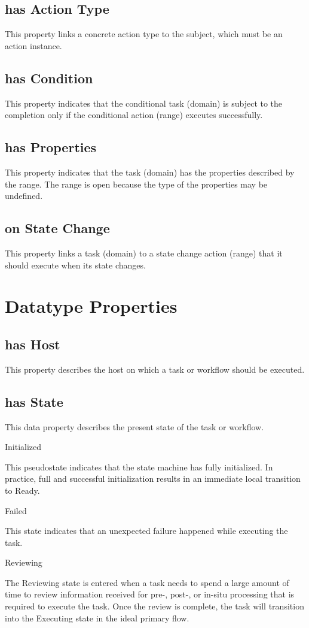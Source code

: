 			\subsection{
			has Action Type
			}
			This property links a concrete action type to the subject, which must be an action instance.
			\subsection{
			has Condition
			}
			This property indicates that the conditional task (domain) is subject to the completion only if the conditional action (range) executes successfully.
			\subsection{
			has Properties
			}
			This property indicates that the task (domain) has the properties described by the range. The range is open because the type of the properties may be undefined.
			\subsection{
			on State Change
			}
			This property links a task (domain) to a state change action (range) that it should execute when its state changes.
\section{Datatype Properties}
			\subsection{
			has Host
			}
			This property describes the host on which a task or workflow should be executed.
			\subsection{
			has State
			}
			This data property describes the present state of the task or workflow.

Initialized

This pseudostate indicates that the state machine has fully initialized. In practice, full and successful initialization results in an immediate local transition to Ready.

Failed

This state indicates that an unexpected failure happened while executing the task.

Reviewing

The Reviewing state is entered when a task needs to spend a large amount of time to review information received for pre-, post-, or in-situ processing that is required to execute the task. Once the review is complete, the task will transition into the Executing state in the ideal primary flow.

